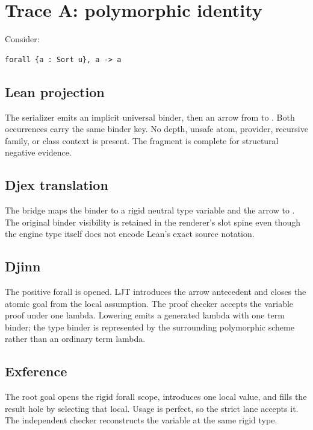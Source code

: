 \documentclass[10pt,letterpaper,oneside]{report}
\newcommand{\code}[1]{\texttt{\detokenize{#1}}}
\begin{document}
\section{Trace A: polymorphic identity}

Consider:

\begin{lstlisting}[language=Leanish]
forall {a : Sort u}, a -> a
\end{lstlisting}

\subsection{Lean projection}

The serializer emits an implicit universal binder, then an arrow from \code{a} to \code{a}. Both occurrences carry the same binder key. No depth, unsafe atom, provider, recursive family, or class context is present. The fragment is complete for structural negative evidence.

\subsection{Djex translation}

The bridge maps the binder to a rigid neutral type variable and the arrow to \code{FunctionType}. The original binder visibility is retained in the renderer's slot spine even though the engine type itself does not encode Lean's exact source notation.

\subsection{Djinn}

The positive forall is opened. LJT introduces the arrow antecedent and closes the atomic goal from the local assumption. The proof checker accepts the variable proof under one lambda. Lowering emits a generated lambda with one term binder; the type binder is represented by the surrounding polymorphic scheme rather than an ordinary term lambda.

\subsection{Exference}

The root goal opens the rigid forall scope, introduces one local value, and fills the result hole by selecting that local. Usage is perfect, so the strict lane accepts it. The independent checker reconstructs the variable at the same rigid type.
\end{document}
